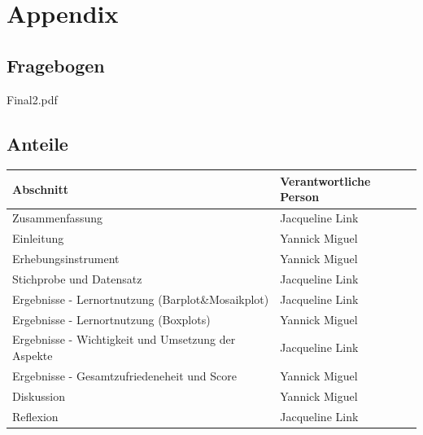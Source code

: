 \documentclass[11pt, a4paper]{article}
\begin{document}
\newpage
\section{Appendix}
\subsection{Fragebogen}

\begin{figure}[h]
	
\end{figure}
\pagestyle{plain}
\newpage
 {Final2.pdf}
\newpage

\subsection{Anteile}
\begin{table}[h]
	\begin{tabular}{l|l}
		Abschnitt                                          & Verantwortliche Person \\ \hline
		Zusammenfassung                                    & Jacqueline Link        \\
		Einleitung                                         & Yannick Miguel         \\
		Erhebungsinstrument                                & Yannick Miguel         \\
		Stichprobe und Datensatz                           &
		Jacqueline Link        \\
		Ergebnisse - Lernortnutzung (Barplot\&Mosaikplot)                       & Jacqueline Link        \\
		Ergebnisse - Lernortnutzung (Boxplots)                       & Yannick Miguel       \\
		Ergebnisse - Wichtigkeit und Umsetzung der Aspekte & Jacqueline Link        \\
		Ergebnisse - Gesamtzufriedeneheit und Score        & Yannick Miguel         \\
		Diskussion                                         & Yannick Miguel         \\
		Reflexion                                          & Jacqueline Link       
	\end{tabular}
\end{table}
\end{document}
